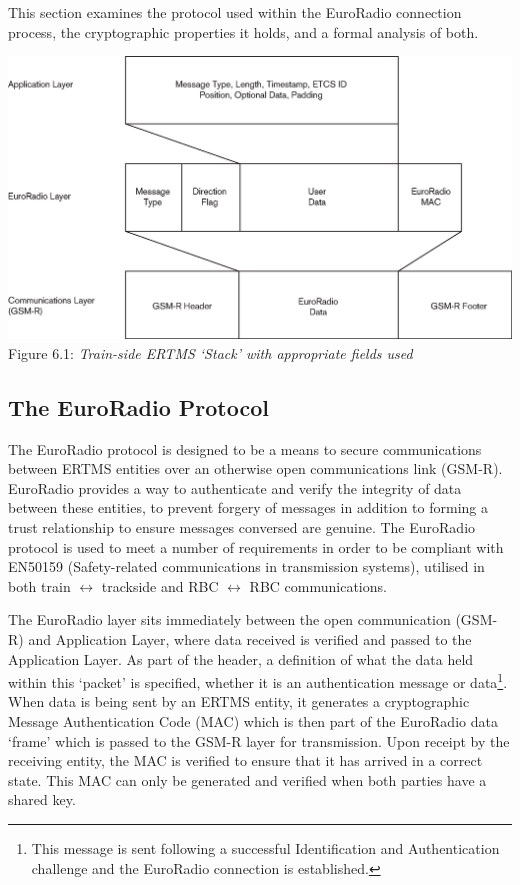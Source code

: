 \documentclass[twoside,11pt,a4paper]{article}
\begin{document}
This section examines the protocol used within the EuroRadio connection process, the cryptographic properties it holds, and a formal analysis of both.
\begin{center}
 \includegraphics[scale=.5]{ERTMSStack.eps}\\
Figure 6.1: \textit{Train-side ERTMS `Stack' with appropriate fields used}
\end{center}

\subsection{The EuroRadio Protocol}
The EuroRadio protocol is designed to be a means to secure communications between ERTMS entities over an otherwise open communications link (GSM-R). EuroRadio provides a way to authenticate and verify the integrity of data between these entities, to prevent forgery of messages in addition to forming a trust relationship to ensure messages conversed are genuine. The EuroRadio protocol is used to meet a number of requirements in order to be compliant with EN50159 (Safety-related communications in transmission systems), utilised in both train $\leftrightarrow$ trackside and RBC $\leftrightarrow$ RBC communications.

The EuroRadio layer sits immediately between the open communication (GSM-R) and Application Layer, where data received is verified and passed to the Application Layer. As part of the header, a definition of what the data held within this `packet' is specified, whether it is an authentication message or data\footnote{This message is sent following a successful Identification and Authentication challenge and the EuroRadio connection is established.}. When data is being sent by an ERTMS entity, it generates a cryptographic  Message Authentication Code (MAC) which is then part of the EuroRadio data `frame' which is passed to the GSM-R layer for transmission. Upon receipt by the receiving entity, the MAC is verified to ensure that it has arrived in a correct state. This MAC can only be generated and verified when both parties have a shared key.
\end{document}
